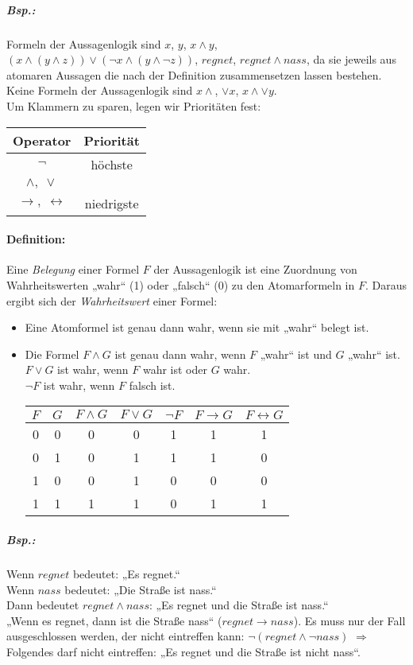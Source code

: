 \subparagraph{Bsp.:} Formeln der Aussagenlogik sind $x$, $y$, $x\wedge y$, $( x\wedge (y \wedge z)) \vee (\neg x \wedge (y \wedge \neg z))$, $regnet$, $regnet \wedge nass$, da sie jeweils aus atomaren Aussagen die nach der Definition zusammensetzen lassen bestehen.\\
Keine Formeln der Aussagenlogik sind $x\wedge$, $\vee x$, $x\wedge \vee y$.\\
Um Klammern zu sparen, legen wir Prioritäten fest:\\
\begin{tabular}{c | c}
Operator & Priorität \\
\hline
$\neg$ & höchste\\
$\wedge ,\; \vee$ & \\
$\rightarrow , \; \leftrightarrow$ & niedrigste\\
\end{tabular}

\paragraph{Definition:} Eine \emph{Belegung} einer Formel $F$ der Aussagenlogik ist eine Zuordnung von Wahrheitswerten „wahr“ (1) oder „falsch“ (0) zu den Atomarformeln in $F$.
Daraus ergibt sich der \emph{Wahrheitswert} einer Formel:
\begin{itemize}
\item Eine Atomformel ist genau dann wahr, wenn sie mit „wahr“ belegt ist.
\item Die Formel $F\wedge G $ ist genau dann wahr, wenn $F$ „wahr“ ist und $G$ „wahr“ ist. \\
$F\vee G$ ist wahr, wenn $F$ wahr ist oder $G$ wahr.\\
$\neg F$ ist wahr, wenn $F$ falsch ist.\\
\begin{tabular}{c c | c c c c c}
$F$&$G$&$F\wedge G$&$F\vee G$&$\neg F$&$F\rightarrow G$& $F\leftrightarrow G$\\
\hline
0&0&0&0&1&1&1\\
0&1&0&1&1&1&0\\
1&0&0&1&0&0&0\\
1&1&1&1&0&1&1\\
\end{tabular}
\end{itemize}

\subparagraph{Bsp.:} Wenn $regnet$ bedeutet: „Es regnet.“\\
Wenn $nass$ bedeutet: „Die Straße ist nass.“\\
Dann bedeutet $regnet \wedge nass$: „Es regnet und die Straße ist nass.“\\
„Wenn es regnet, dann ist die Straße nass“ ($regnet \rightarrow nass$). Es muss nur der Fall ausgeschlossen werden, der nicht eintreffen kann: $\neg (regnet \wedge \neg nass)$ $\Rightarrow$ Folgendes darf nicht eintreffen: „Es regnet und die Straße ist nicht nass“. 

